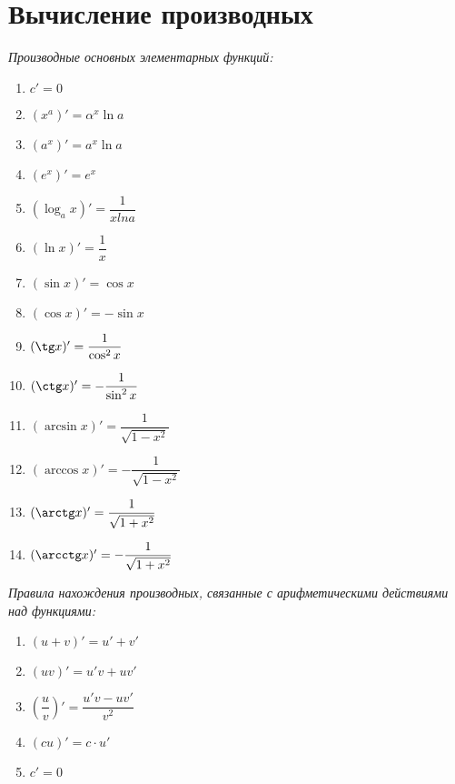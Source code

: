 \documentclass[a4paper,12pt]{article} %
\begin{document}
\section{Вычисление производных}

\textit{Производные основных элементарных функций:}
\begin{enumerate}
\item $c'=0$
\item $(x^{a})'=\alpha^{x}\ln a$
\item $(a^{x})'=a^{x}\ln a$
\item $(e^{x})'=e^{x}$
\item $(\log_{a}x)'=\dfrac{1}{x ln a}$
\item $(\ln x)'=\dfrac{1}{x}$
\item $(\sin x)'=\cos x$
\item $(\cos x)'=-\sin x$
\item $(\tg x)'=\dfrac{1}{\cos^{2}x}$
\item $(\ctg x)'=-\dfrac{1}{\sin^{2}x}$
\item $(\arcsin x)'=\dfrac{1}{\sqrt{1-x^{2}}}$
\item $(\arccos x)'=-\dfrac{1}{\sqrt{1-x^{2}}}$
\item $(\arctg x)'=\dfrac{1}{\sqrt{1+x^{2}}}$
\item $(\arcctg x)'=-\dfrac{1}{\sqrt{1+x^{2}}}$
\end{enumerate}

\textit{Правила нахождения производных, связанные с арифметическими
действиями над функциями:}
\begin{enumerate}
\item $(u+v)'=u'+v'$
\item $(uv)'=u'v+uv'$
\item $(\dfrac{u}{v})'=\dfrac{u'v-uv'}{v^{2}}$
\item $(cu)'=c \cdot u'$
\item $c'=0$
\end{enumerate}
\end{document}
